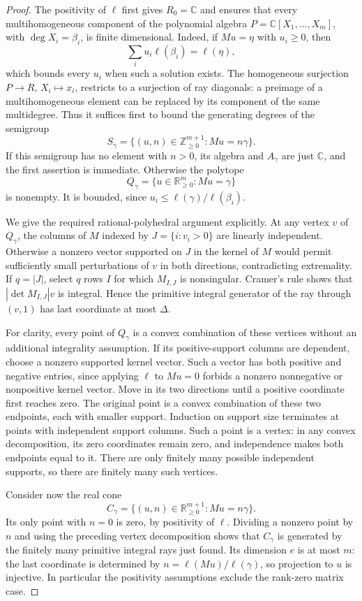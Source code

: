 \begin{proof}
The positivity of $\ell$ first gives $R_0=\mathbb C$ and ensures that
every multihomogeneous component of the polynomial algebra
$P=\mathbb C[X_1,\ldots,X_m]$, with $\deg X_i=\beta_i$, is finite
dimensional. Indeed, if $M u=\eta$ with $u_i\ge0$, then
\[
 \sum_i u_i\ell(\beta_i)=\ell(\eta),
\]
which bounds every $u_i$ when such a solution exists. The homogeneous
surjection $P\longrightarrow R$, $X_i\mapsto x_i$, restricts to a
surjection of ray diagonals: a preimage of a multihomogeneous element
can be replaced by its component of the same multidegree. Thus it
suffices first to bound the generating degrees of the semigroup
\[
 S_\gamma=\{(u,n)\in\mathbb Z_{\ge0}^{m+1}:Mu=n\gamma\}.
 \tag{P-F16d}
\]
If this semigroup has no element with $n>0$, its algebra and $A_\gamma$
are just $\mathbb C$, and the first assertion is immediate. Otherwise
the polytope
\[
 Q_\gamma=\{u\in\mathbb R_{\ge0}^m:Mu=\gamma\}
\]
is nonempty. It is bounded, since
$u_i\le\ell(\gamma)/\ell(\beta_i)$.

We give the required rational-polyhedral argument explicitly.
At any vertex $v$ of $Q_\gamma$, the columns of $M$ indexed by
$J=\{i:v_i>0\}$ are linearly independent. Otherwise a nonzero
vector supported on $J$ in the kernel of $M$ would permit sufficiently
small perturbations of $v$ in both directions, contradicting extremality.
If $q=|J|$, select $q$ rows $I$ for which $M_{I,J}$ is nonsingular.
Cramer's rule shows that $|\det M_{I,J}|v$ is integral. Hence the
primitive integral generator of the ray through $(v,1)$ has last
coordinate at most $\Delta$.

For clarity, every point of $Q_\gamma$ is a convex combination of
these vertices without an additional integrality assumption. If its
positive-support columns are dependent, choose a nonzero supported
kernel vector. Such a vector has both positive and negative entries,
since applying $\ell$ to $M u=0$ forbids a nonzero nonnegative or
nonpositive kernel vector. Move in its two directions until a positive
coordinate first reaches zero. The original point is a convex
combination of these two endpoints, each with smaller support.
Induction on support size terminates at points with independent
support columns. Such a point is a vertex: in any convex decomposition,
its zero coordinates remain zero, and independence makes both endpoints
equal to it. There are only finitely many possible independent supports,
so there are finitely many such vertices.

Consider now the real cone
\[
 C_\gamma=\{(u,n)\in\mathbb R_{\ge0}^{m+1}:Mu=n\gamma\}.
\]
Its only point with $n=0$ is zero, by positivity of $\ell$.
Dividing a nonzero point by $n$ and using the preceding vertex
decomposition shows that $C_\gamma$ is generated by the finitely many
primitive integral rays just found. Its dimension $e$ is at most $m$:
the last coordinate is determined by
$n=\ell(Mu)/\ell(\gamma)$, so projection to $u$ is injective.
In particular the positivity assumptions exclude the rank-zero matrix
case.


\end{proof}
